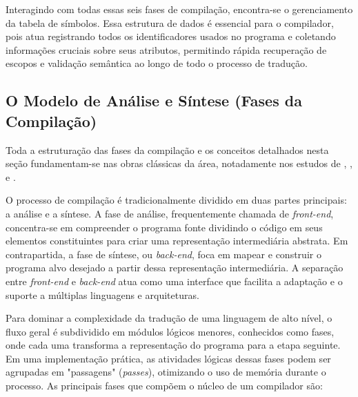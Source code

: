 Interagindo com todas essas seis fases de compilação, encontra-se o gerenciamento da tabela de símbolos. Essa estrutura de dados é essencial para o compilador, pois atua registrando todos os identificadores usados no programa e coletando informações cruciais sobre seus atributos, permitindo rápida recuperação de escopos e validação semântica ao longo de todo o processo de tradução.

\subsection{O Modelo de Análise e Síntese (Fases da Compilação)}

Toda a estruturação das fases da compilação e os conceitos detalhados nesta seção fundamentam-se nas obras clássicas da área, notadamente nos estudos de , ,  e .

O processo de compilação é tradicionalmente dividido em duas partes principais: a análise e a síntese.
A fase de análise, frequentemente chamada de \textit{front-end}, concentra-se em compreender o programa fonte dividindo o código em seus elementos constituintes para criar uma representação intermediária abstrata.
Em contrapartida, a fase de síntese, ou \textit{back-end}, foca em mapear e construir o programa alvo desejado a partir dessa representação intermediária.
A separação entre \textit{front-end} e \textit{back-end} atua como uma interface que facilita a adaptação e o suporte a múltiplas linguagens e arquiteturas.

Para dominar a complexidade da tradução de uma linguagem de alto nível, o fluxo geral é subdividido em módulos lógicos menores, conhecidos como fases, onde cada uma transforma a representação do programa para a etapa seguinte.
Em uma implementação prática, as atividades lógicas dessas fases podem ser agrupadas em "passagens" (\textit{passes}), otimizando o uso de memória durante o processo.
As principais fases que compõem o núcleo de um compilador são:

